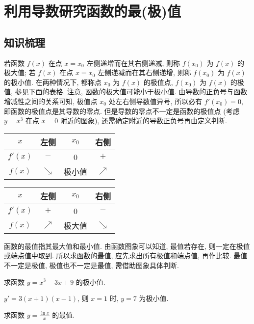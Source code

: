   \section{利用导数研究函数的最(极)值}

  \subsection{知识梳理}
  若函数 $f(x)$ 在点 $x=x_0$ 左侧递增而在其右侧递减, 则称 $f(x_0)$ 为 $f(x)$ 的极大值; 
  若 $f(x)$ 在点 $x=x_0$ 左侧递减而在其右侧递增, 则称 $f(x_0)$ 为 $f(x)$ 的极小值. 
  在两种情况下, 都称点 $x_0$ 为 $f(x)$ 的极值点, $f(x_0)$ 为 $f(x)$ 的极值,
  参见下面的表格. 注意, 函数的极大值可能小于极小值.
  由导数的正负号与函数增减性之间的关系可知, 极值点 $x_0$ 处左右侧导数值异号, 
  所以必有 $f'(x_0)= 0$, 即函数的极值点是其导数的零点. 
  但是导数的零点不一定是函数的极值点 (考虑 $y=x^3$ 在点 $x=0$ 附近的图象), 还需确定附近的导数正负号再由定义判断.
  \begin{center}
    \small
    \begin{tabular}{c|ccc}
         $x$  & 左侧 & $x_0$ & 右侧 \\
      \hline
      $f'(x)$ & $-$ & 0 & $+$ \\
      $f(x)$ & $\searrow$ & 极小值 & $\nearrow$
    \end{tabular}
    \qquad
    \begin{tabular}{c|ccc}
        $x$   & 左侧 & $x_0$ & 右侧 \\
      \hline
      $f'(x)$ & $+$ & 0 & $-$ \\
      $f(x)$ & $\nearrow$ & 极大值 & $\searrow$
    \end{tabular}
  \end{center}
  
  函数的最值指其最大值和最小值. 由函数图象可以知道, 最值若存在, 
  则一定在极值或端点值中取到. 所以求函数的最值, 应先求出所有极值和端点值, 再作比较.
  最值不一定是极值, 极值也不一定是最值, 需借助图象具体判断.

  \lianxi
  \begin{exercise}
    求函数 $y=x^3 -3x+9$ 的极小值.
  \end{exercise}

  \beginsolution
    $y'=3(x+1)(x-1)$, 则 $x=1$ 时, $y=7$ 为极小值.
  \endsolution

  \begin{exercise}
    求函数 $y=\frac{\ln x}x$ 的最值.
  \end{exercise}

